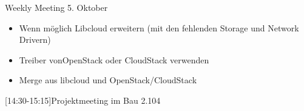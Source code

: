 \begin{Protokoll}{Weekly Meeting 5. Oktober}
\begin{itemize}
  \item Wenn möglich Libcloud erweitern (mit den fehlenden Storage und Network Drivern)
\end{itemize}

\begin{itemize}
  \item Treiber vonOpenStack oder CloudStack verwenden
  \item Merge aus libcloud und OpenStack/CloudStack
\end{itemize}

[14:30-15:15]{Projektmeeting im Bau 2.104}

\end{Protokoll}

